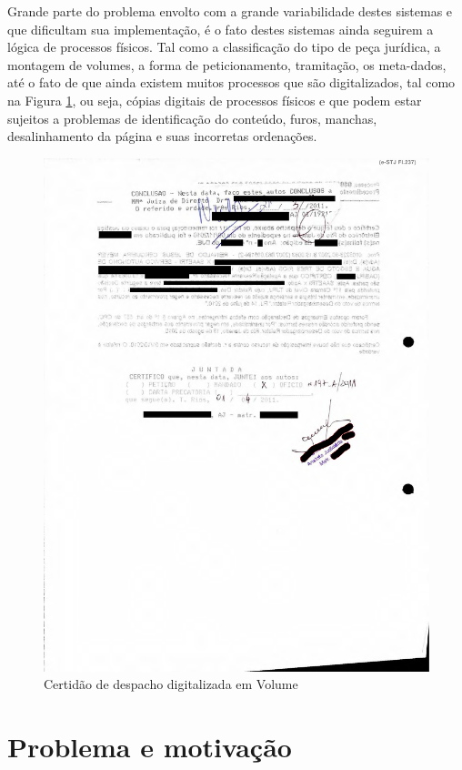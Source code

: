 Grande parte do problema envolto com a grande variabilidade destes sistemas e que dificultam sua implementação, é o fato destes sistemas ainda seguirem a lógica de processos físicos. Tal como a classificação do tipo de peça jurídica, a montagem de volumes, a forma de peticionamento, tramitação, os meta-dados, até o fato de que ainda existem muitos processos que são digitalizados, tal como na Figura \ref{fig:bad_scan}, ou seja, cópias digitais de processos físicos e que podem estar sujeitos a problemas de identificação do conteúdo, furos, manchas, desalinhamento da página e suas incorretas ordenações.

\begin{figure}[!ht]
	\centering
	\label{fig:bad_scan}
		\includegraphics[keepaspectratio=true,scale=0.3]{figuras/badScan}
	\caption{Certidão de despacho digitalizada em Volume}
\end{figure}

\section{Problema e motivação}


